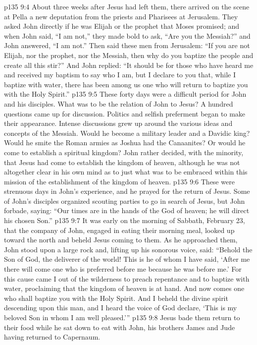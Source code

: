 \vs p135 9:4 About three weeks after Jesus had left them, there arrived on the scene at Pella a new deputation from the priests and Pharisees at Jerusalem. They asked John directly if he was Elijah or the prophet that Moses promised; and when John said, “I am not,” they made bold to ask, “Are you the Messiah?” and John answered, “I am not.” Then said these men from Jerusalem: “If you are not Elijah, nor the prophet, nor the Messiah, then why do you baptize the people and create all this stir?” And John replied: “It should be for those who have heard me and received my baptism to say who I am, but I declare to you that, while I baptize with water, there has been among us one who will return to baptize you with the Holy Spirit.”
\vs p135 9:5 These forty days were a difficult period for John and his disciples. What was to be the relation of John to Jesus? A hundred questions came up for discussion. Politics and selfish preferment began to make their appearance. Intense discussions grew up around the various ideas and concepts of the Messiah. Would he become a military leader and a Davidic king? Would he smite the Roman armies as Joshua had the Canaanites? Or would he come to establish a spiritual kingdom? John rather decided, with the minority, that Jesus had come to establish the kingdom of heaven, although he was not altogether clear in his own mind as to just what was to be embraced within this mission of the establishment of the kingdom of heaven.
\vs p135 9:6 These were strenuous days in John’s experience, and he prayed for the return of Jesus. Some of John’s disciples organized scouting parties to go in search of Jesus, but John forbade, saying: “Our times are in the hands of the God of heaven; he will direct his chosen Son.”
\pc \vs p135 9:7 It was early on the morning of Sabbath, February 23, that the company of John, engaged in eating their morning meal, looked up toward the north and beheld Jesus coming to them. As he approached them, John stood upon a large rock and, lifting up his sonorous voice, said: “Behold the Son of God, the deliverer of the world! This is he of whom I have said, ‘After me there will come one who is preferred before me because he was before me.’ For this cause came I out of the wilderness to preach repentance and to baptize with water, proclaiming that the kingdom of heaven is at hand. And now comes one who shall baptize you with the Holy Spirit. And I beheld the divine spirit descending upon this man, and I heard the voice of God declare, ‘This is my beloved Son in whom I am well pleased.’”
\vs p135 9:8 Jesus bade them return to their food while he sat down to eat with John, his brothers James and Jude having returned to Capernaum.
